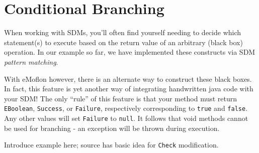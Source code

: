 \newpage
\section{Conditional Branching}


When working with SDMs, you'll often find yourself needing to decide which statement(s) to execute based on the return value of an arbitrary (black box)
operation. In our example so far, we have implemented these constructs via SDM \emph{pattern matching}. 

With eMoflon however, there is an alternate way to
construct these black boxes. In fact, this feature is yet another way of integrating handwritten java code with your SDM! The only ``rule'' of this feature is that your
method must return \texttt{EBoolean}, \texttt{Success}, or \texttt{Failure}, respectively corresponding to \texttt{true} and \texttt{false}. Any other values
will set \texttt{Failure} to \texttt{null}. It follows that void methods cannot be used for branching - an exception will be thrown during execution.

Introduce example here; source has basic idea for \texttt{Check} modification.

% 
% 







